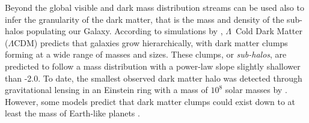\documentclass{aa}
\begin{document}
  
  
  Beyond the global visible and dark mass distribution streams can be used also to infer the granularity of the dark matter, that is the mass and density of the sub-halos populating our Galaxy. According to simulations by \citet{2008MNRAS.391.1685S}, $\Lambda$~Cold Dark Matter ($\Lambda$CDM) predicts that galaxies grow hierarchically, with dark matter clumps forming at a wide range of masses and sizes. These clumps, or \textit{sub-halos}, are predicted to follow a mass distribution with a power-law slope slightly shallower than -2.0. To date, the smallest observed dark matter halo was detected through gravitational lensing in an Einstein ring with a mass of $10^8$ solar masses by \citet{2012Natur.481..341V}. However, some models predict that dark matter clumps could exist down to at least the mass of Earth-like planets \citep[see][and discussion in \citet{2021arXiv211101148A}]{2005JCAP...08..003G}. 
\end{document}
